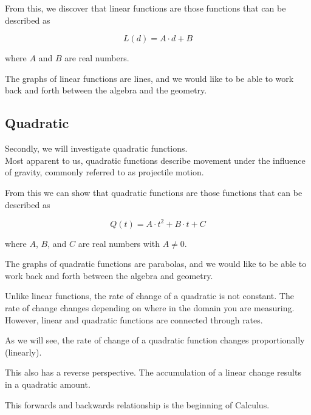 \documentclass{ximera}
\begin{document}
From this, we discover that linear functions are those functions that can be described as

\[  L(d) = A \cdot d + B \]

where $A$ and $B$ are real numbers.


The graphs of linear functions are lines, and we would like to be able to work back and forth between the algebra and the geometry.













\subsection*{Quadratic}


Secondly, we will investigate quadratic functions. \\


Most apparent to us, quadratic functions describe movement under the influence of gravity, commonly referred to as projectile motion. 





From this we can show that quadratic functions are those functions that can be described as

\[  Q(t) = A \cdot t^2 + B \cdot t + C \]

where $A$, $B$, and $C$ are real numbers with $A \ne 0$. 



The graphs of quadratic functions are parabolas, and we would like to be able to work back and forth between the algebra and geometry. 



Unlike linear functions, the rate of change of a quadratic is not constant. The rate of change changes depending on where in the domain you are measuring.  However, linear and quadratic functions are connected through rates. 

As we will see, the rate of change of a quadratic function changes proportionally (linearly). 


This also has a reverse perspective.  The accumulation of a linear change results in a quadratic amount.



This forwards and backwards relationship is the beginning of Calculus.
\end{document}
